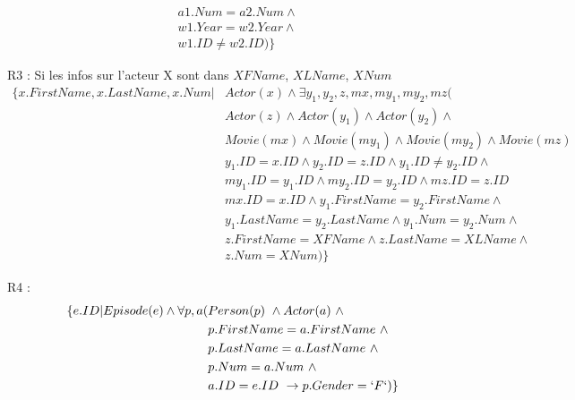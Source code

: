 \documentclass[a4paper,12pt]{article}
\begin{document}
\begin{list}{-}{}
\begin{align*}
      & a1.Num = a2.Num \wedge \\
      & w1.Year = w2.Year \wedge \\
      & w1.ID \neq w2.ID ) \}
    \end{align*}
  \item R3 :
    Si les infos sur l'acteur X sont dans $XFName$, $XLName$, $XNum$
    \begin{align*}
      \{ x.FirstName, x.LastName, x.Num | &Actor(x) \wedge \exists y_1, y_2, z, mx, my_1, my_2, mz ( \\
      & Actor(z) \wedge Actor(y_1) \wedge Actor(y_2) \wedge \\
      & Movie(mx) \wedge Movie(my_1) \wedge Movie(my_2) \wedge Movie(mz) \\
      & y_1.ID = x.ID \wedge y_2.ID = z.ID \wedge y_1.ID \neq y_2.ID \wedge \\
      & my_1.ID = y_1.ID \wedge my_2.ID = y_2.ID \wedge mz.ID = z.ID \\
      & mx.ID = x.ID \wedge y_1.FirstName = y_2.FirstName \wedge \\
      & y_1.LastName = y_2.LastName \wedge y_1.Num = y_2.Num \wedge \\
      & z.FirstName = XFName \wedge z.LastName = XLName \wedge \\
      & z.Num = XNum)\}
    \end{align*}
  \item R4 :
    \begin{align*}
      \{ e.ID | Episode(e) \wedge \forall p, a (&Person(p) ~\wedge Actor(a) ~\wedge \\
        & p.FirstName = a.FirstName ~\wedge \\
        & p.LastName = a.LastName ~\wedge \\
        & p.Num = a.Num ~\wedge \\
        & a.ID = e.ID ~\rightarrow p.Gender = `F`)\}
    \end{align*}
\end{list}
\end{document}

